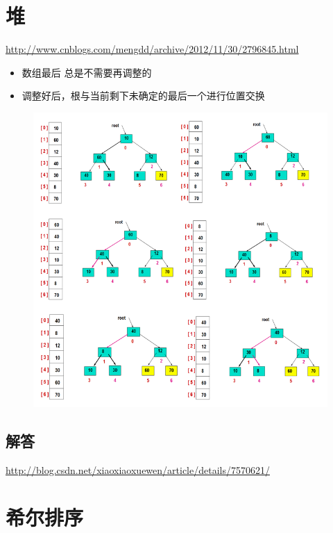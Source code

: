 \documentclass[UTF8,a4paper,12pt]{ctexbook}
\begin{document}
	
	
\newpage	
\section{堆}
	\url{http://www.cnblogs.com/mengdd/archive/2012/11/30/2796845.html}
	
		\begin{itemize}
			\item  数组最后 总是不需要再调整的
			\item  调整好后，根与当前剩下未确定的最后一个进行位置交换
		\end{itemize}
	
		\begin{figure}[H]
			\centering
			\includegraphics*[scale = 0.7]{Heap.png}
		\end{figure}
	\subsection{解答}
	
	\url{http://blog.csdn.net/xiaoxiaoxuewen/article/details/7570621/}
	
\section{希尔排序}
	
\end{document}
